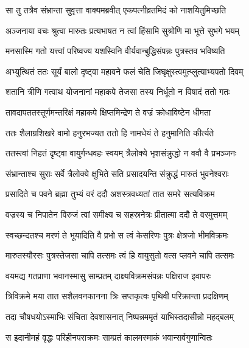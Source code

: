 \twolineshloka
{सा तु तत्रैव संभ्रान्ता सुवृत्ता वाक्यमब्रवीत्}
{एकपत्नीव्रतमिदं को नाशयितुमिच्छति} %

\twolineshloka
{अञ्जनाया वचः श्रुत्वा मारुतः प्रत्यभाषत}
{न त्वां हिंसामि सुश्रोणि मा भूत्ते सुभगे भयम्} %

\twolineshloka
{मनसास्मि गतो यत्त्वां परिष्वज्य यशस्विनि}
{वीर्यवान्बुद्धिसंपन्नः पुत्रस्तव भविष्यति} %

\twolineshloka
{अभ्युत्थितं ततः सूर्यं बालो दृष्ट्वा महावने}
{फलं चेति जिघृक्षुस्त्वमुत्प्लुत्याभ्यपतो दिवम्} %

\twolineshloka
{शतानि त्रीणि गत्वाथ योजनानां महाकपे}
{तेजसा तस्य निर्धूतो न विषादं ततो गतः} %

\twolineshloka
{तावदापततस्तूर्णमन्तरिक्षं महाकपे}
{क्षिप्तमिन्द्रेण ते वज्रं क्रोधाविष्टेन धीमता} %

\twolineshloka
{ततः शैलाग्रशिखरे वामो हनुरभज्यत}
{ततो हि नामधेयं ते हनुमानिति कीर्त्यते} %

\twolineshloka
{ततस्त्वां निहतं दृष्ट्वा वायुर्गन्धवहः स्वयम्}
{त्रैलोक्ये भृशसंक्रुद्धो न ववौ वै प्रभञ्जनः} %

\twolineshloka
{संभ्रान्ताश्च सुराः सर्वे त्रैलोक्ये क्षुभिते सति}
{प्रसादयन्ति संक्रुद्धं मारुतं भुवनेश्वराः} %

\twolineshloka
{प्रसादिते च पवने ब्रह्मा तुभ्यं वरं ददौ}
{अशस्त्रवध्यतां तात समरे सत्यविक्रम} %

\twolineshloka
{वज्रस्य च निपातेन विरुजं त्वां समीक्ष्य च}
{सहस्रनेत्रः प्रीतात्मा ददौ ते वरमुत्तमम्} %

\twolineshloka
{स्वच्छन्दतश्च मरणं ते भूयादिति वै प्रभो}
{स त्वं केसरिणः पुत्रः क्षेत्रजो भीमविक्रमः} %

\twolineshloka
{मारुतस्यौरसः पुत्रस्तेजसा चापि तत्समः}
{त्वं हि वायुसुतो वत्स प्लवने चापि तत्समः} %

\twolineshloka
{वयमद्य गतप्राणा भवानस्मासु साम्प्रतम्}
{दाक्ष्यविक्रमसंपन्नः पक्षिराज इवापरः} %

\twolineshloka
{त्रिविक्रमे मया तात सशैलवनकानना}
{त्रिः सप्तकृत्वः पृथिवी परिक्रान्ता प्रदक्षिणम्} %

\twolineshloka
{तदा चौषधयोऽस्माभिः संचिता देवशासनात्}
{निष्पन्नममृतं याभिस्तदासीन्नो महद्बलम्} %

\twolineshloka
{स इदानीमहं वृद्धः परिहीनपराक्रमः}
{साम्प्रतं कालमस्माकं भवान्सर्वगुणान्वितः} %

